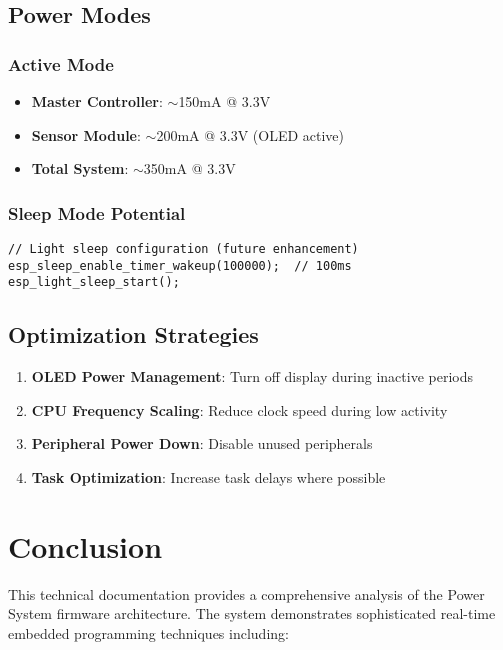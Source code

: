 \documentclass[11pt,a4paper]{article}
\begin{document}
\subsection{Power Modes}

\subsubsection{Active Mode}
\begin{itemize}
    \item \textbf{Master Controller}: $\sim$150mA @ 3.3V
    \item \textbf{Sensor Module}: $\sim$200mA @ 3.3V (OLED active)
    \item \textbf{Total System}: $\sim$350mA @ 3.3V
\end{itemize}

\subsubsection{Sleep Mode Potential}
\begin{lstlisting}[caption=Light Sleep Configuration]
// Light sleep configuration (future enhancement)
esp_sleep_enable_timer_wakeup(100000);  // 100ms
esp_light_sleep_start();
\end{lstlisting}

\subsection{Optimization Strategies}

\begin{enumerate}
    \item \textbf{OLED Power Management}: Turn off display during inactive periods
    \item \textbf{CPU Frequency Scaling}: Reduce clock speed during low activity
    \item \textbf{Peripheral Power Down}: Disable unused peripherals
    \item \textbf{Task Optimization}: Increase task delays where possible
\end{enumerate}

\section{Conclusion}

This technical documentation provides a comprehensive analysis of the Power System firmware architecture. The system demonstrates sophisticated real-time embedded programming techniques including:
\end{document}
